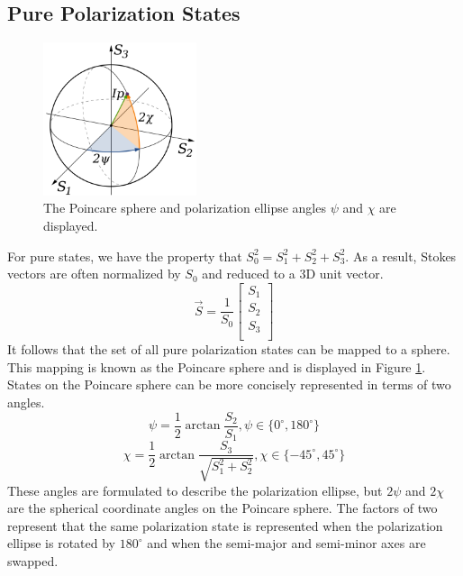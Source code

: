 \documentclass{article}
\begin{document}
\subsection{Pure Polarization States}
\begin{figure}[!h]
\begin{center}
\includegraphics[width=0.4\textwidth]{refs_figures/Poincare_sphere.png}
\end{center}
\caption{The Poincare sphere and polarization ellipse angles $\psi$ and $\chi$ are displayed.}
\label{Poincare Sphere}
\end{figure}

For pure states, we have the property that $S_0^2=S_1^2+S_2^2+S_3^2$. As a result, Stokes vectors are often normalized by $S_0$ and reduced to a 3D unit vector.
\begin{equation}
    \Vec{S}= \frac{1}{S_0}\begin{bmatrix}
    S_1\\
    S_2\\
    S_3\\
    \end{bmatrix}
\end{equation}
It follows that the set of all pure polarization states can be mapped to a sphere. This mapping is known as the Poincare sphere and is displayed in Figure \ref{Poincare Sphere}. States on the Poincare sphere can be more concisely represented in terms of two angles.
\begin{equation}
    \psi = \frac{1}{2}\arctan{\frac{S_2}{S_1}}, \psi\in\{0^{\circ}, 180^{\circ}\}
\end{equation}
\begin{equation}
    \chi = \frac{1}{2}\arctan{\frac{S_3}{\sqrt{S_1^2 + S_2^2}}}, \chi\in\{-45^{\circ}, 45^{\circ}\}
\end{equation}
These angles are formulated to describe the polarization ellipse, but $2\psi$ and $2\chi$ are the spherical coordinate angles on the Poincare sphere. The factors of two represent that the same polarization state is represented when the polarization ellipse is rotated by $180^{\circ}$ and when the semi-major and semi-minor axes are swapped.
\end{document}
